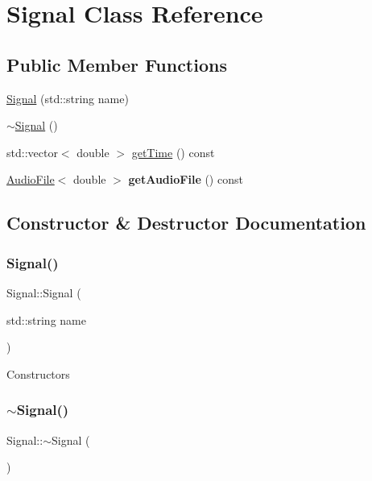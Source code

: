 \hypertarget{class_signal}{}\section{Signal Class Reference}
\label{class_signal}
\subsection*{Public Member Functions}
\begin{DoxyCompactItemize}
\item 
\hyperlink{class_signal_adc5d70461299de8a723f2aa59767b13f}{Signal} (std\+::string name)
\item 
\hyperlink{class_signal_ae7a1d116cda63e790bf9aab549d57d3a}{$\sim$\+Signal} ()
\item 
std\+::vector$<$ double $>$ \hyperlink{class_signal_a9e55e5bdd1606e4e21edfd19e31a83df}{get\+Time} () const
\item 
\mbox{\label{class_signal_a35b36f112a3bd2593a50c827b9ac1e06}} 
\hyperlink{class_audio_file}{Audio\+File}$<$ double $>$ {\bfseries get\+Audio\+File} () const
\end{DoxyCompactItemize}


\subsection{Constructor \& Destructor Documentation}
\mbox{\label{class_signal_adc5d70461299de8a723f2aa59767b13f}} 
\subsubsection{\texorpdfstring{Signal()}{Signal()}}
{\footnotesize\ttfamily Signal\+::\+Signal (\begin{DoxyParamCaption}\item[{std\+::string}]{name }\end{DoxyParamCaption})}

Constructors \mbox{\label{class_signal_ae7a1d116cda63e790bf9aab549d57d3a}} 
\subsubsection{\texorpdfstring{$\sim$\+Signal()}{~Signal()}}
{\footnotesize\ttfamily Signal\+::$\sim$\+Signal (\begin{DoxyParamCaption}{ }\end{DoxyParamCaption})}

